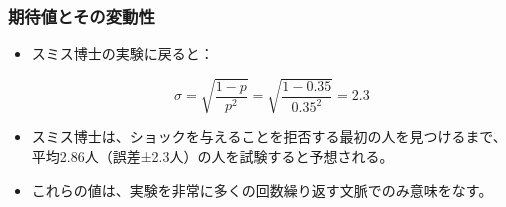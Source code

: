 
\begin{frame}
\frametitle{期待値とその変動性}


\begin{itemize}

\item スミス博士の実験に戻ると：

\[ \sigma = \sqrt{\frac{1-p}{p^2}} = \sqrt{\frac{1-0.35}{0.35^2}} = 2.3 \]

\item スミス博士は、ショックを与えることを拒否する最初の人を見つけるまで、平均2.86人（誤差±2.3人）の人を試験すると予想される。

\item これらの値は、実験を非常に多くの回数繰り返す文脈でのみ意味をなす。

\end{itemize}

\end{frame}

